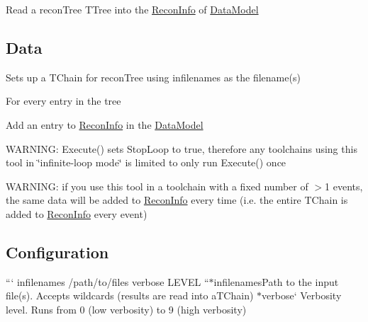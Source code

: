 Read a {\ttfamily recon\-Tree} {\ttfamily T\-Tree} into the {\ttfamily \hyperlink{classReconInfo}{Recon\-Info}} of {\ttfamily \hyperlink{classDataModel}{Data\-Model}}

\subsection*{Data}


\begin{DoxyItemize}
\item Sets up a {\ttfamily T\-Chain} for {\ttfamily recon\-Tree} using {\ttfamily infilenames} as the filename(s)
\item For every entry in the tree
\begin{DoxyItemize}
\item Add an entry to {\ttfamily \hyperlink{classReconInfo}{Recon\-Info}} in the {\ttfamily \hyperlink{classDataModel}{Data\-Model}}
\end{DoxyItemize}
\item W\-A\-R\-N\-I\-N\-G\-: {\ttfamily Execute()} sets {\ttfamily Stop\-Loop} to {\ttfamily true}, therefore any toolchains using this tool in \char`\"{}infinite-\/loop mode\char`\"{} is limited to only run {\ttfamily Execute()} once
\item W\-A\-R\-N\-I\-N\-G\-: if you use this tool in a toolchain with a fixed number of {\ttfamily $>$1} events, the same data will be added to {\ttfamily \hyperlink{classReconInfo}{Recon\-Info}} every time (i.\-e. the entire {\ttfamily T\-Chain} is added to {\ttfamily \hyperlink{classReconInfo}{Recon\-Info}} every event)
\end{DoxyItemize}

\subsection*{Configuration}

``` infilenames /path/to/files verbose L\-E\-V\-E\-L ``{\ttfamily  $\ast$}infilenames{\ttfamily Path to the input file(s). Accepts wildcards (results are read into a}T\-Chain{\ttfamily ) $\ast$}verbose` Verbosity level. Runs from 0 (low verbosity) to 9 (high verbosity) 